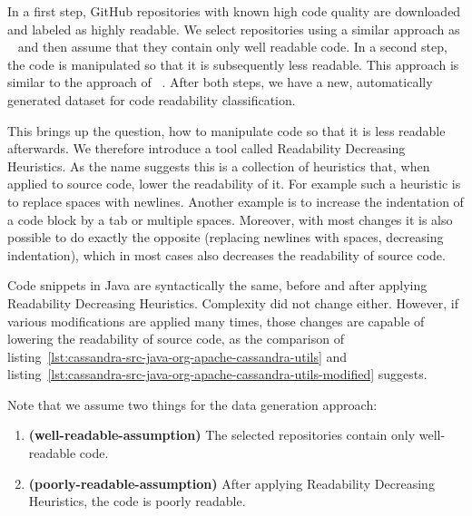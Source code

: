 \documentclass[%
class=scrreprt,
chapterprefix=false,%
open=right,%
twoside=false,%
paper=a4,%
logofile={Logo\_zentral\_farbig\_EN.png},%
thesistype=master,%
UKenglish,%
]{se2thesis}
\theoremstyle{definition}
\begin{document}
	In a first step, GitHub repositories with known high code quality are downloaded and labeled as highly readable. We select repositories using a similar approach as \citeauthor{allamanis2016convolutional}~\cite{allamanis2016convolutional} and then assume that they contain only well readable code.
	In a second step, the code is manipulated so that it is subsequently less readable. This approach is similar to the approach of \citeauthor{loriot2022styler}~\cite{loriot2022styler}. After both steps, we have a new, automatically generated dataset for code readability classification.
	
	This brings up the question, how to manipulate code so that it is less readable afterwards. We therefore introduce a tool called Readability Decreasing Heuristics. As the name suggests this is a collection of heuristics that, when applied to source code, lower the readability of it. For example such a heuristic is to replace spaces with newlines. Another example is to increase the indentation of a code block by a tab or multiple spaces. Moreover, with most changes it is also possible to do exactly the opposite (replacing newlines with spaces, decreasing indentation), which in most cases also decreases the readability of source code.
	
	Code snippets in Java are syntactically the same, before and after applying Readability Decreasing Heuristics. Complexity did not change either. However, if various modifications are applied many times, those changes are capable of lowering the readability of source code, as the comparison of listing~\ref{lst:cassandra-src-java-org-apache-cassandra-utils} and listing~\ref{lst:cassandra-src-java-org-apache-cassandra-utils-modified} suggests.
	
	Note that we assume two things for the data generation approach:
	\begin{enumerate}[label={Assumption \arabic*},ref={\arabic*},leftmargin=*]
		\item \label{well-readable-assumption} \textbf{(well-readable-assumption)} The selected repositories contain only well-readable code.
		\item \label{poorly-readable-assumption} \textbf{(poorly-readable-assumption)} After applying Readability Decreasing Heuristics, the code is poorly readable.
	\end{enumerate}
	
\end{document}
